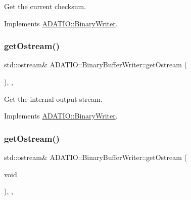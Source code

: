 Get the current checksum. 



Implements \mbox{\hyperlink{classADATIO_1_1BinaryWriter_a8bebb70a7248b14c8a4dcf7aa49c1503}{A\+D\+A\+T\+I\+O\+::\+Binary\+Writer}}.

\mbox{\label{classADATIO_1_1BinaryBufferWriter_a587ce48f0cf6dd4064edde6db836c0a3}} 
\subsubsection{\texorpdfstring{getOstream()}{getOstream()}\hspace{0.1cm}{\footnotesize\ttfamily [1/2]}}
{\footnotesize\ttfamily std\+::ostream\& A\+D\+A\+T\+I\+O\+::\+Binary\+Buffer\+Writer\+::get\+Ostream (\begin{DoxyParamCaption}{ }\end{DoxyParamCaption})\hspace{0.3cm}{\ttfamily [inline]}, {\ttfamily [protected]}, {\ttfamily [virtual]}}



Get the internal output stream. 



Implements \mbox{\hyperlink{classADATIO_1_1BinaryWriter_a4fe227341d17d012bb83a070c208dac0}{A\+D\+A\+T\+I\+O\+::\+Binary\+Writer}}.

\mbox{\label{classADATIO_1_1BinaryBufferWriter_a587ce48f0cf6dd4064edde6db836c0a3}} 
\subsubsection{\texorpdfstring{getOstream()}{getOstream()}\hspace{0.1cm}{\footnotesize\ttfamily [2/2]}}
{\footnotesize\ttfamily std\+::ostream\& A\+D\+A\+T\+I\+O\+::\+Binary\+Buffer\+Writer\+::get\+Ostream (\begin{DoxyParamCaption}\item[{void}]{ }\end{DoxyParamCaption})\hspace{0.3cm}{\ttfamily [inline]}, {\ttfamily [protected]}, {\ttfamily [virtual]}}



